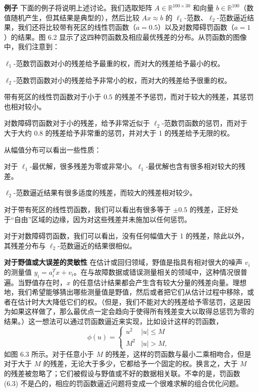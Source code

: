 \documentclass[UTF8,12pt,a4paper,fontset=fandol]{ctexart}
\begin{document}
\noindent\textbf{例子}\quad
下面的例子将说明上述讨论。我们选取矩阵 $A\in\mathbb{R}^{100\times 30}$ 和向量 $b\in\mathbb{R}^{100}$（数值随机产生，但其结果是典型的），然后比较 $Ax\approx b$ 的 $\ell_1$-范数、$\ell_2$-范数逼近结果，我们还将比较带有死区的线性罚函数（$a=0.5$）以及对数障碍罚函数（$a=1$）的结果。图 6.2 显示了这四种罚函数及相应最优残差的分布。从罚函数的图像中，我们注意到：

$\ell_1$-范数罚函数对小的残差给予最重的权，而对大的残差给予最小的权。

$\ell_2$-范数罚函数对小的残差给予非常小的权，而对大的残差给予很重的权。

带有死区的线性罚函数对于小于 $0.5$ 的残差不予惩罚，而对于较大的残差，其惩罚也相对较小。

对数障碍罚函数对于小的残差，给予非常近似于 $\ell_2$-范数罚函数的惩罚，而对于大于大约 $0.8$ 的残差给予非常重的惩罚，并对大于 1 的残差给予无限的权。

从幅值分布可以看出一些性质：

对于 $\ell_1$-最优解，很多残差为零或非常小。$\ell_1$-最优解也含有很多相对较大的残差。

$\ell_2$-范数逼近结果有很多适度的残差，而较大的残差相对较少。

对于带有死区的线性罚函数，我们可以看出有很多等于 $\pm 0.5$ 的残差，正好处于``自由''区域的边缘，因为对这些残差并未施加以任何惩罚。

对于对数障碍罚函数，我们可以看出，没有任何幅值大于 1 的残差，除此以外，其残差分布与 $\ell_2$-范数逼近的结果很相似。

\noindent\textbf{对于野值或大误差的灵敏性}\quad
在估计或回归领域，野值是指具有相对很大的噪声 $v_i$ 的测量值 $y_i=a_i^Tx+v_i$。在与故障数据或错误测量相关的领域中，这种情况很普遍。当野值存在时，$x$ 的任意估计结果都会产生含有较大分量的残差向量。理想地，我们希望能够猜出哪些测量值是野值，然后或者把它们从估计过程中移除，或者在估计时大大降低它们的权。（但是，我们不能对大的残差给予零惩罚，这是因为如果这样做了，那么最优点一定会趋向于使得所有残差变大以取得总惩罚为零的结果。）这一想法可以通过罚函数逼近来实现，比如设计这样的罚函数，
\begin{equation}
\phi(u)=
\begin{cases}
u^2 & |u|\leq M\\
M^2 & |u|>M,
\end{cases}
\tag{6.3}
\end{equation}
如图 6.3 所示。对于任意小于 $M$ 的残差，这样的罚函数与最小二乘相吻合，但是对于大于 $M$ 的残差，无论大于多少，它都给予一个固定的权。换言之，大于 $M$ 的残差被忽略了；它们被假设与野值或不好的数据相关联。不幸的是，罚函数 (6.3) 不是凸的，相应的罚函数逼近问题将变成一个很难求解的组合优化问题。
\end{document}
